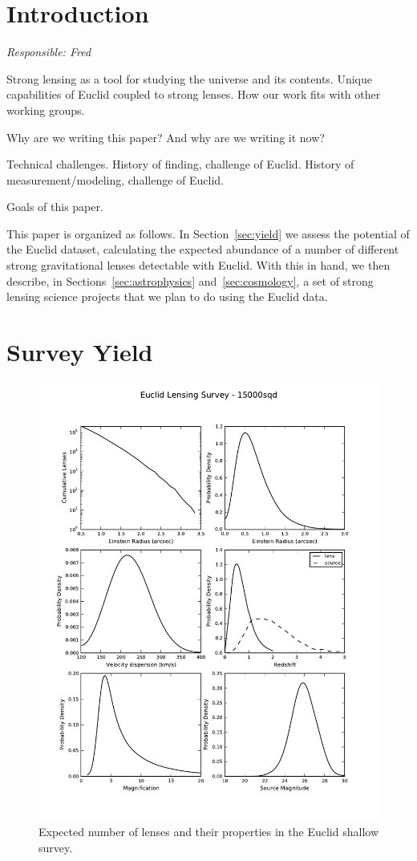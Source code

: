 \documentclass[twocolumn]{svjour3}
\begin{document}

\section{Introduction}

{\it Responsible: Fred}

Strong lensing as a tool for studying the universe and its contents.
Unique capabilities of Euclid coupled to strong lenses. How our  work
fits with other working groups.

Why are we writing this paper? And why are we writing it now?

Technical challenges. History of finding, challenge of Euclid. History
of  measurement/modeling, challenge of Euclid.

Goals of this paper.

This paper is organized as follows. In Section~\ref{sec:yield} we assess
the  potential of the Euclid dataset, calculating the expected abundance
of a  number of different strong gravitational lenses detectable with
Euclid. With  this in hand, we then  describe, in
Sections~\ref{sec:astrophysics} and~\ref{sec:cosmology}, a set  of
strong lensing science projects that we plan to do using the Euclid
data.


\section{Survey Yield}


\begin{figure}[t]
\centering
\includegraphics[width=0.7\hsize]{allplots_Euclid-3.pdf}
\caption{Expected number of lenses and their properties in the Euclid shallow survey.}
\end{figure}
\end{document}
